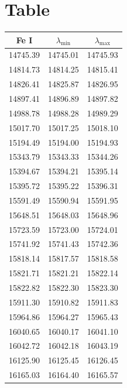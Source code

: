 \section{Table}
\begin{table}[h!]
  \vspace{0.3cm}
  \begin{minipage}[t]{.4\linewidth}
  \begin{center}
    \begin{tabular}{ccc}
          \hline
      \hline
      Fe I & $\lambda_{\mathrm{min}}$ & $\lambda_{\mathrm{max}}$ \\
      \hline
          14745.39 & 14745.01 & 14745.93 \\
          14814.73 & 14814.25 & 14815.41 \\
          14826.41 & 14825.87 & 14826.95 \\
          14897.41 & 14896.89 & 14897.82 \\
          14988.78 & 14988.28 & 14989.29 \\
          15017.70 & 15017.25 & 15018.10 \\
          15194.49 & 15194.00 & 15194.93 \\
          15343.79 & 15343.33 & 15344.26 \\
          15394.67 & 15394.21 & 15395.14 \\
          15395.72 & 15395.22 & 15396.31 \\
          15591.49 & 15590.94 & 15591.95 \\
          15648.51 & 15648.03 & 15648.96 \\
          15723.59 & 15723.00 & 15724.01 \\
          15741.92 & 15741.43 & 15742.36 \\
          15818.14 & 15817.57 & 15818.58 \\
          15821.71 & 15821.21 & 15822.14 \\
          15822.82 & 15822.30 & 15823.30 \\
          15911.30 & 15910.82 & 15911.83 \\
          15964.86 & 15964.27 & 15965.43 \\
          16040.65 & 16040.17 & 16041.10 \\
          16042.72 & 16042.18 & 16043.19 \\
          16125.90 & 16125.45 & 16126.45 \\
          16165.03 & 16164.40 & 16165.57 \\

\end{tabular}
\end{center}
\end{minipage}
\end{table}
